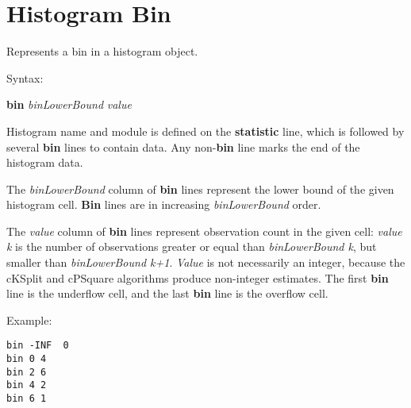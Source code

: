 \section{Histogram Bin}

Represents a bin in a histogram object.

Syntax:

\hspace{20mm} \textbf{bin} \textit{binLowerBound} \textit{value}

Histogram name and module is defined on the \textbf{statistic} line,
which is followed by several \textbf{bin} lines to contain data. Any
non{}-\textbf{bin} line marks the end of the histogram data.

The \textit{binLowerBound }column of \textbf{bin} lines represent the
lower bound of the given histogram cell. \textbf{Bin} lines are in
increasing \textit{binLowerBound} order.

The \textit{value} column of \textbf{bin} lines represent observation
count in the given cell: \textit{value k} is the number of observations
greater or equal than \textit{binLowerBound k}, but smaller than
\textit{binLowerBound k+1}. \textit{Value} is not necessarily an
integer, because the cKSplit and cPSquare algorithms produce
non{}-integer estimates. The first \textbf{bin} line is the underflow
cell, and the last \textbf{bin} line is the overflow cell.


Example:

\begin{verbatim}
bin -INF  0
bin 0 4
bin 2 6
bin 4 2
bin 6 1
\end{verbatim}


